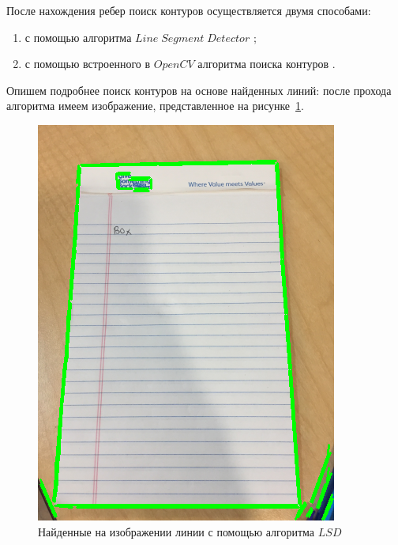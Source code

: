 После нахождения ребер поиск контуров осуществляется двумя способами:
\begin{enumerate}
    \item с помощью алгоритма $Line\;Segment\;Detector$ \cite{lsd};
    \item с помощью встроенного в $OpenCV$ алгоритма поиска контуров \cite{opencv_contours}.
\end{enumerate}

Опишем подробнее поиск контуров на основе найденных линий: после прохода алгоритма имеем изображение, представленное на рисунке~\ref{lsd_img}.
\begin{figure}
    \includegraphics[scale=0.25]{img/perspective/lsd.png}
    \caption{Найденные на изображении линии с помощью алгоритма $LSD$}
    \label{lsd_img}
\end{figure}

